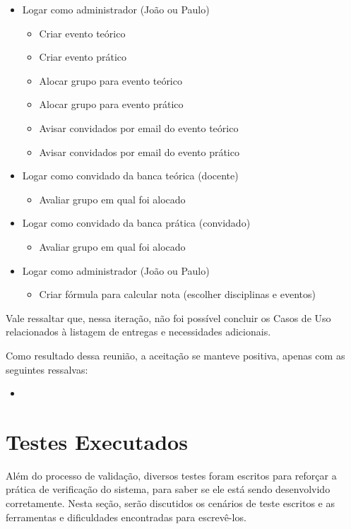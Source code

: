 \begin{itemize}
    \item Logar como administrador (João ou Paulo)
    \begin{itemize}
        \item Criar evento teórico
        \item Criar evento prático
        \item Alocar grupo para evento teórico
        \item Alocar grupo para evento prático
        \item Avisar convidados por email do evento teórico
        \item Avisar convidados por email do evento prático
    \end{itemize}
    
    \item Logar como convidado da banca teórica (docente)
    \begin{itemize}
        \item Avaliar grupo em qual foi alocado
    \end{itemize}
    
    \item Logar como convidado da banca prática (convidado)
    \begin{itemize}
        \item Avaliar grupo em qual foi alocado
    \end{itemize}
    
    \item Logar como administrador (João ou Paulo)
    \begin{itemize}
        \item Criar fórmula para calcular nota (escolher disciplinas e eventos)
    \end{itemize}
\end{itemize}

Vale ressaltar que, nessa iteração, não foi possível concluir os Casos de Uso relacionados à listagem de entregas e necessidades adicionais.

Como resultado dessa reunião, a aceitação se manteve positiva, apenas com as seguintes ressalvas:

\begin{itemize}
    \item 
\end{itemize}

\section{Testes Executados}
Além do processo de validação, diversos testes foram escritos para reforçar a prática de verificação do sistema, para saber se ele está sendo desenvolvido corretamente. Nesta seção, serão discutidos os cenários de teste escritos e as ferramentas e dificuldades encontradas para escrevê-los.

